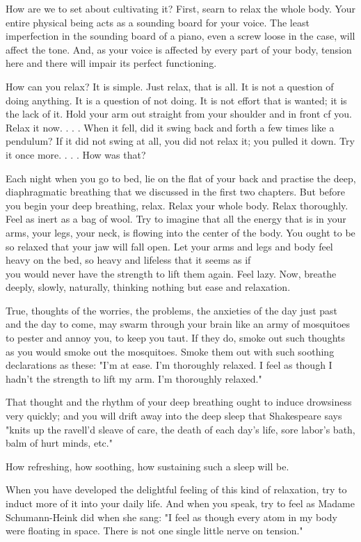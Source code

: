 \documentclass[10pt]{article}
\begin{document}
How are we to set about cultivating it? First, searn to relax the whole body. Your entire physical being acts as a sounding board for your voice. The least imperfection in the sounding board of a piano, even a screw loose in the case, will affect the tone. And, as your voice is affected by every part of your body, tension here and there will impair its perfect functioning.

How can you relax? It is simple. Just relax, that is all. It is not a question of doing anything. It is a question of not doing. It is not effort that is wanted; it is the lack of it. Hold your arm out straight from your shoulder and in front cf you. Relax it now. . . . When it fell, did it swing back and forth a few times like a pendulum? If it did not swing at all, you did not relax it; you pulled it down. Try it once more. . . . How was that?

Each night when you go to bed, lie on the flat of your back and practise the deep, diaphragmatic breathing that we discussed in the first two chapters. But before you begin your deep breathing, relax. Relax your whole body. Relax thoroughly. Feel as inert as a bag of wool. Try to imagine that all the energy that is in your arms, your legs, your neck, is flowing into the center of the body. You ought to be so relaxed that your jaw will fall open. Let your arms and legs and body feel heavy on the bed, so heavy and lifeless that it seems as if\\
you would never have the strength to lift them again. Feel lazy. Now, breathe deeply, slowly, naturally, thinking nothing but ease and relaxation.

True, thoughts of the worries, the problems, the anxieties of the day just past and the day to come, may swarm through your brain like an army of mosquitoes to pester and annoy you, to keep you taut. If they do, smoke out such thoughts as you would smoke out the mosquitoes. Smoke them out with such soothing declarations as these: "I'm at ease. I'm thoroughly relaxed. I feel as though I hadn't the strength to lift my arm. I'm thoroughly relaxed."

That thought and the rhythm of your deep breathing ought to induce drowsiness very quickly; and you will drift away into the deep sleep that Shakespeare says "knits up the ravell'd sleave of care, the death of each day's life, sore labor's bath, balm of hurt minds, etc."

How refreshing, how soothing, how sustaining such a sleep will be.

When you have developed the delightful feeling of this kind of relaxation, try to induct more of it into your daily life. And when you speak, try to feel as Madame Schumann-Heink did when she sang: "I feel as though every atom in my body were floating in space. There is not one single little nerve on tension."
\end{document}
